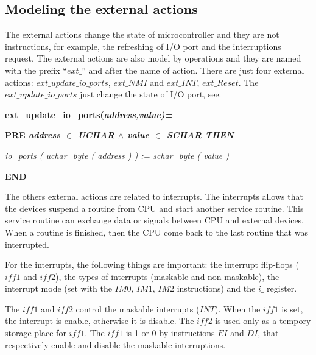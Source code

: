\documentclass[11pt]{article} %
\begin{document}
\subsection{Modeling the external actions}
\label{sec:externalactions}

The external actions change the state of microcontroller and they are not
instructions, for example, the refreshing of I/O port and the interruptions
request. The external actions are also model by operations and they are named with the
prefix ``$ext\_$'' and after the name of action. There are just four external
actions: $ext\_update\_io\_ports$, $ext\_NMI$ and $ext\_INT$, $ext\_Reset$. The
$ext\_update\_io\_ports$ just change the state of I/O port, see.

\hspace*{0.20in}\bf ext\_update\_io\_ports\rm (\it address\rm ,\it value\rm )\rm =

\hspace*{0.20in}\bf PRE \it address  $\in$  \it UCHAR  $\land$ \hspace*{0.10in}\it value  $\in$  \it SCHAR \bf THEN

\hspace*{0.40in}\it io\_ports \rm ( \it uchar\_byte \rm ( \it address \rm ) \rm ) \rm := \it schar\_byte \rm ( \it
value \rm )

\hspace*{0.20in}\bf END\rm 

The others external actions are related to interrupts. The interrupts allows that the devices suspend a routine from CPU and start
another service routine. This service routine can exchange data or signals between CPU and external devices. When a
routine is finished, then the CPU come back to the last routine that was interrupted.

For the interrupts, the following things are important:  the interrupt flip-flops ($\mathit{iff1}$ and
$\mathit{iff2}$), the types of interrupts (maskable and non-maskable), the interrupt mode (set with the $\mathit{IM
0}$, $\mathit{IM 1}$, $\mathit{IM 2}$ instructions) and the $\mathit{i\_}$ register.

The $\mathit{iff1}$ and $\mathit{iff2}$ control the maskable interrupts ($\mathit{INT}$). When the $\mathit{iff1}$
is set, the interrupt is enable, otherwise it is disable. The $\mathit{iff2}$ is used only as a tempory storage
place for $\mathit{iff1}$. The $\mathit{iff1}$ is 1 or 0 by instructions $\mathit{EI}$ and $\mathit{DI}$, that respectively
enable and disable the maskable interruptions.  
\end{document}
